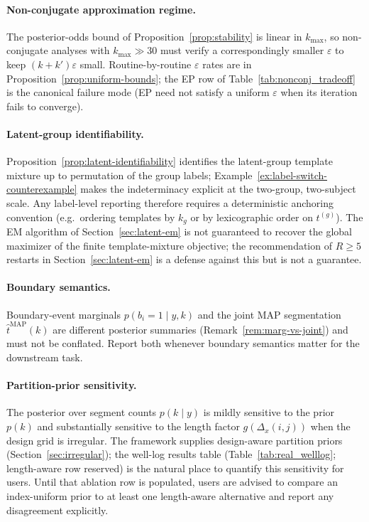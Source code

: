 \paragraph{Non-conjugate approximation regime.}
The posterior-odds bound of Proposition~\ref{prop:stability} is linear in $k_{\max}$, so
non-conjugate analyses with $k_{\max}\gg 30$ must verify a correspondingly smaller $\varepsilon$
to keep $(k+k')\varepsilon$ small. Routine-by-routine $\varepsilon$ rates are in
Proposition~\ref{prop:uniform-bounds}; the EP row of Table~\ref{tab:nonconj_tradeoff} is the
canonical failure mode (EP need not satisfy a uniform $\varepsilon$ when its iteration fails to
converge).

\paragraph{Latent-group identifiability.}
Proposition~\ref{prop:latent-identifiability} identifies the latent-group template
mixture up to permutation of the group labels;
Example~\ref{ex:label-switch-counterexample} makes the indeterminacy explicit at the
two-group, two-subject scale. Any label-level reporting therefore requires a
deterministic anchoring convention (e.g.\ ordering templates by $k_g$ or by lexicographic
order on $t^{(g)}$). The EM algorithm of Section~\ref{sec:latent-em} is not guaranteed to
recover the global maximizer of the finite template-mixture objective; the
recommendation of $R\ge 5$ restarts in Section~\ref{sec:latent-em} is a defense against
this but is not a guarantee.

\paragraph{Boundary semantics.}
Boundary-event marginals $p(b_i=1\mid y,k)$ and the joint MAP segmentation
$\widehat t^{\mathrm{MAP}}(k)$ are different posterior summaries (Remark~\ref{rem:marg-vs-joint})
and must not be conflated. Report both whenever boundary semantics matter for the downstream task.

\paragraph{Partition-prior sensitivity.}
The posterior over segment counts $p(k\mid y)$ is mildly sensitive to the prior $p(k)$
and substantially sensitive to the length factor $g(\Delta_x(i,j))$ when the design grid is
irregular. The framework supplies design-aware partition priors
(Section~\ref{sec:irregular}); the well-log results table (Table~\ref{tab:real_welllog};
length-aware row reserved) is the natural place to quantify this sensitivity for users.
Until that ablation row is populated, users are advised to compare an index-uniform prior to
at least one length-aware alternative and report any disagreement explicitly.

